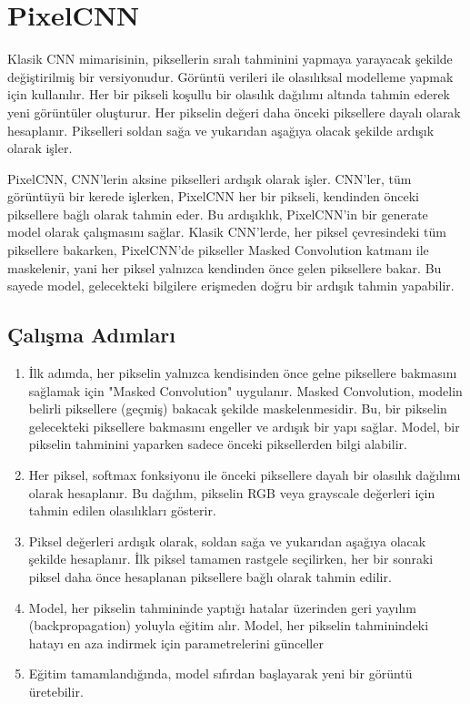 \section{PixelCNN}

Klasik CNN mimarisinin, piksellerin sıralı tahminini yapmaya yarayacak şekilde değiştirilmiş bir versiyonudur. Görüntü verileri ile olasılıksal modelleme yapmak için kullanılır. Her bir pikseli koşullu bir olasılık dağılımı altında tahmin ederek yeni görüntüler oluşturur. Her pikselin değeri daha önceki piksellere dayalı olarak hesaplanır. Pikselleri soldan sağa ve yukarıdan aşağıya olacak şekilde ardışık olarak işler.

PixelCNN, CNN'lerin aksine pikselleri ardışık olarak işler. CNN'ler, tüm görüntüyü bir kerede işlerken, PixelCNN her bir pikseli, kendinden önceki piksellere bağlı olarak tahmin eder. Bu ardışıklık, PixelCNN'in bir generate model olarak çalışmasını sağlar. Klasik CNN'lerde, her piksel çevresindeki tüm piksellere bakarken, PixelCNN'de pikseller Masked Convolution katmanı ile maskelenir, yani her piksel yalnızca kendinden önce gelen piksellere bakar. Bu sayede model, gelecekteki bilgilere erişmeden doğru bir ardışık tahmin yapabilir.

\subsection{Çalışma Adımları}

\begin{enumerate}
    \item İlk adımda, her pikselin yalnızca kendisinden önce gelne piksellere bakmasını sağlamak için "Masked Convolution" uygulanır. Masked Convolution, modelin belirli piksellere (geçmiş) bakacak şekilde maskelenmesidir. Bu, bir pikselin gelecekteki piksellere bakmasını engeller ve ardışık bir yapı sağlar. Model, bir pikselin tahminini yaparken sadece önceki piksellerden bilgi alabilir.
    \item Her piksel, softmax fonksiyonu ile önceki piksellere dayalı bir olasılık dağılımı olarak hesaplanır. Bu dağılım, pikselin RGB veya grayscale değerleri için tahmin edilen olasılıkları gösterir.
    \item Piksel değerleri ardışık olarak, soldan sağa ve yukarıdan aşağıya olacak şekilde hesaplanır. İlk piksel tamamen rastgele seçilirken, her bir sonraki piksel daha önce hesaplanan piksellere bağlı olarak tahmin edilir.
    \item Model, her pikselin tahmininde yaptığı hatalar üzerinden geri yayılım (backpropagation) yoluyla eğitim alır. Model, her pikselin tahminindeki hatayı en aza indirmek için parametrelerini günceller
    \item Eğitim tamamlandığında, model sıfırdan başlayarak yeni bir görüntü üretebilir.
\end{enumerate}

